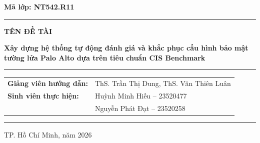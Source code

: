 \documentclass[12pt,a4paper]{article}
\renewcommand{\arraystretch}{1.3}
\begin{document}
\begin{titlepage}
\begin{center}
    \vspace{0.28cm}

    {\large
    \textbf{Mã lớp: NT542.R11}
    \par}

    \vspace{0.28cm}

    {\color{UITBlue}
    \rule{0.85\textwidth}{0.7pt}
    }

    \vspace{0.28cm}

    {\large\bfseries
    TÊN ĐỀ TÀI
    \par}

    \vspace{0.20cm}

    \begin{minipage}{0.92\textwidth}
        \centering
        {\Large\bfseries\color{UITBlue}
        Xây dựng hệ thống tự động đánh giá và khắc phục cấu hình bảo mật tường lửa Palo Alto dựa trên tiêu chuẩn CIS Benchmark
        \par}
    \end{minipage}

    \vspace{0.28cm}

    {\color{UITBlue}
    \rule{0.85\textwidth}{0.7pt}
    }

    \vspace{0.4cm}

    \begin{minipage}{0.95\textwidth}

        \renewcommand{\arraystretch}{1.6}

        \begin{tabular}{@{}p{5cm}l@{}}

            \textbf{Giảng viên hướng dẫn:}
            & ThS. Trần Thị Dung, ThS. Văn Thiên Luân \\

            \textbf{Sinh viên thực hiện:}
            & Huỳnh Minh Hiếu -- 23520477 \\

            & Nguyễn Phát Đạt -- 23520258 \\

        \end{tabular}

    \end{minipage}
    \vfill
    {\color{UITBlue}\rule{0.65\textwidth}{0.6pt}}\par
    \vspace{0.20cm}
    {\normalsize TP. Hồ Chí Minh, năm 2026\par}
\end{center}
\end{titlepage}
\end{document}

